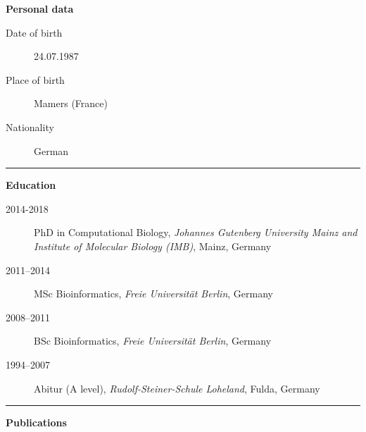 \documentclass[a4paper,twoside=true,openright,parskip=full,chapterprefix=true,11pt,headings=normal,bibliography=totoc,listof=totoc,titlepage=on,captions=tableabove,draft=false]{scrreprt}
\theoremstyle{definition}
\theoremstyle{definition}
\theoremstyle{definition}
\theoremstyle{remark}
\begin{document}
\textbf{Personal data }

\begin{description}
\item[Date of birth]
24.07.1987
\item[Place of birth]
Mamers (France)
\item[Nationality]
German
\end{description}

\begin{center}\rule{0.5\linewidth}{\linethickness}\end{center}

\textbf{Education}

\begin{description}
\item[2014-2018]
PhD in Computational Biology, \emph{Johannes Gutenberg University Mainz
and Institute of Molecular Biology (IMB)}, Mainz, Germany
\item[2011--2014]
MSc Bioinformatics, \emph{Freie Universität Berlin}, Germany
\item[2008--2011]
BSc Bioinformatics, \emph{Freie Universität Berlin}, Germany
\item[1994--2007]
Abitur (A level), \emph{Rudolf-Steiner-Schule Loheland}, Fulda, Germany
\end{description}

\begin{center}\rule{0.5\linewidth}{\linethickness}\end{center}

\textbf{Publications}
\end{document}
